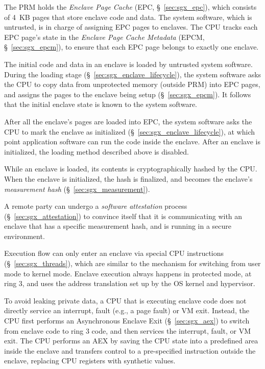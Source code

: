 The PRM holds the \textit{Enclave Page Cache} (EPC, \S~\ref{sec:sgx_epc}),
which consists of 4~KB pages that store enclave code and data. The system
software, which is untrusted, is in charge of assigning EPC pages to enclaves.
The CPU tracks each EPC page's state in the \textit{Enclave Page Cache
Metadata} (EPCM, \S~\ref{sec:sgx_epcm}), to ensure that each EPC page belongs
to exactly one enclave.

The initial code and data in an enclave is loaded by untrusted system software.
During the loading stage (\S~\ref{sec:sgx_enclave_lifecycle}), the system
software asks the CPU to copy data from unprotected memory (outside PRM) into
EPC pages, and assigns the pages to the enclave being setup
(\S~\ref{sec:sgx_epcm}). It follows that the initial enclave state is known to
the system software.

After all the enclave's pages are loaded into EPC, the system software asks the
CPU to mark the enclave as initialized (\S~\ref{sec:sgx_enclave_lifecycle}), at
which point application software can run the code inside the enclave. After an
enclave is initialized, the loading method described above is disabled.

While an enclave is loaded, its contents is cryptographically hashed by the
CPU. When the enclave is initialized, the hash is finalized, and becomes the
enclave's \textit{measurement hash} (\S~\ref{sec:sgx_measurement}).

A remote party can undergo a \textit{software attestation} process
(\S~\ref{sec:sgx_attestation}) to convince itself that it is communicating with
an enclave that has a specific measurement hash, and is running in a secure
environment.

Execution flow can only enter an enclave via special CPU instructions
(\S~\ref{sec:sgx_threads}), which are similar to the mechanism for switching
from user mode to kernel mode. Enclave execution always happens in protected
mode, at ring 3, and uses the address translation set up by the OS kernel and
hypervisor.

To avoid leaking private data, a CPU that is executing enclave code does not
directly service an interrupt, fault (e.g., a page fault) or VM exit. Instead,
the CPU first performs an Asynchronous Enclave Exit (\S~\ref{sec:sgx_aex}) to
switch from enclave code to ring 3 code, and then services the interrupt,
fault, or VM exit.  The CPU performs an AEX by saving the CPU state into a
predefined area inside the enclave and transfers control to a pre-specified
instruction outside the enclave, replacing CPU registers with synthetic values.

